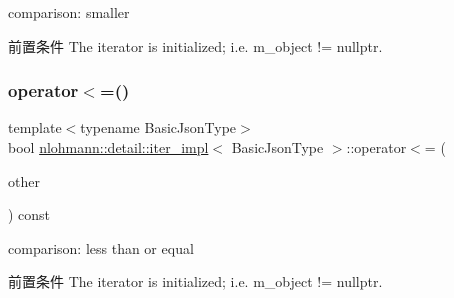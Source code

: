 comparison\+: smaller 

\begin{DoxyPrecond}{前置条件}
The iterator is initialized; i.\+e. {\ttfamily m\+\_\+object != nullptr}. 
\end{DoxyPrecond}
\mbox{\label{classnlohmann_1_1detail_1_1iter__impl_ac6f71b36d7c87e427d1fee83f2600fad}} 
\subsubsection{\texorpdfstring{operator$<$=()}{operator<=()}}
{\footnotesize\ttfamily template$<$typename Basic\+Json\+Type$>$ \\
bool \mbox{\hyperlink{classnlohmann_1_1detail_1_1iter__impl}{nlohmann\+::detail\+::iter\+\_\+impl}}$<$ Basic\+Json\+Type $>$\+::operator$<$= (\begin{DoxyParamCaption}\item[{const \mbox{\hyperlink{classnlohmann_1_1detail_1_1iter__impl}{iter\+\_\+impl}}$<$ Basic\+Json\+Type $>$ \&}]{other }\end{DoxyParamCaption}) const\hspace{0.3cm}{\ttfamily [inline]}}



comparison\+: less than or equal 

\begin{DoxyPrecond}{前置条件}
The iterator is initialized; i.\+e. {\ttfamily m\+\_\+object != nullptr}. 
\end{DoxyPrecond}
\mbox{\label{classnlohmann_1_1detail_1_1iter__impl_a9a5cd7864a8f848ef107d3f5a330f5e7}} 
